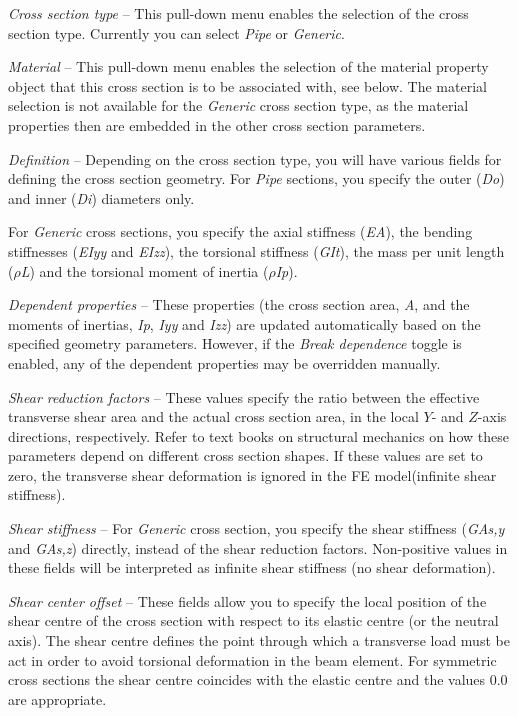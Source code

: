 \begin{bulletlist}
\item{\sl Cross section type} --
  This pull-down menu enables the selection of the cross section type.
  Currently you can select {\sl Pipe} or {\sl Generic}.

\item{\sl Material} --
  This pull-down menu enables the selection of the material property object that
  this cross section is to be associated with,
  see  below. The material selection is
  not available for the {\sl Generic} cross section type, as the material
  properties then are embedded in the other cross section parameters.

\item{\sl Definition} --
  Depending on the cross section type, you will have various fields for defining
  the cross section geometry. For {\sl Pipe} sections, you specify the outer
  ({\sl Do}) and inner ({\sl Di}) diameters only.

\item For {\sl Generic} cross sections,
  you specify the axial stiffness ({\sl EA}),
  the bending stiffnesses ({\sl EIyy} and {\sl EIzz}),
  the torsional stiffness ({\sl GIt}),
  the mass per unit length ($\rho${\sl L})
  and the torsional moment of inertia ($\rho${\sl Ip}).

\item{\sl Dependent properties} --
  These properties (the cross section area, {\sl A},
  and the moments of inertias, {\sl Ip}, {\sl Iyy} and {\sl Izz})
  are updated automatically based on the specified geometry parameters.
  However, if the {\sl Break dependence} toggle is enabled,
  any of the dependent properties may be overridden manually.

\item{\sl Shear reduction factors} --
  These values specify the ratio between the effective transverse shear area and
  the actual cross section area, in the local $Y$- and $Z$-axis directions,
  respectively. Refer to text books on structural mechanics on how these
  parameters depend on different cross section shapes.
  If these values are set to zero, the transverse shear deformation is ignored
  in the FE model(infinite shear stiffness).

\item{\sl Shear stiffness} --
  For {\sl Generic} cross section, you specify the shear stiffness ({\sl GAs,y}
  and {\sl GAs,z}) directly, instead of the shear reduction factors.
  Non-positive values in these fields will be interpreted as infinite
  shear stiffness (no shear deformation).

\item{\sl Shear center offset} --
  These fields allow you to specify the local position of the shear centre of
  the cross section with respect to its elastic centre (or the neutral axis).
  The shear centre defines the point through which a transverse load must be
  act in order to avoid torsional deformation in the beam element.
  For symmetric cross sections the shear centre coincides with the elastic
  centre and the values 0.0 are appropriate.
\end{bulletlist}


